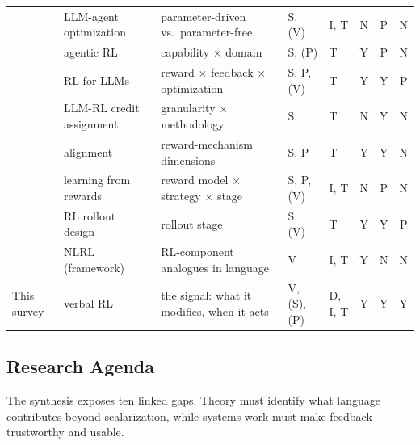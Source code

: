 \begin{table}[t]
\begin{tabular}{@{} p{} p{} p{} p{} p{} c c c @{}}
        \citet{du2025survey} & LLM-agent optimization & parameter-driven vs.\ parameter-free & S, (V) & I, T & N & P & N \\
        \citet{zhang2025landscape} & agentic RL & capability $\times$ domain & S, (P) & T & Y & P & N \\
        \citet{srivastava2025technical} & RL for LLMs & reward $\times$ feedback $\times$ optimization & S, P, (V) & T & Y & Y & P \\
        \citet{zhang2026reasoning} & LLM-RL credit assignment & granularity $\times$ methodology & S & T & N & Y & N \\
        \citet{ji2025survey} & alignment & reward-mechanism dimensions & S, P & T & Y & Y & N \\
        \citet{wu2025sailing} & learning from rewards & reward model $\times$ strategy $\times$ stage & S, P, (V) & I, T & N & P & N \\
        \citet{surana2026generate} & RL rollout design & rollout stage & S, (V) & T & Y & Y & P \\
        \citet{feng2024natural} & NLRL (framework) & RL-component analogues in language & V & I, T & Y & N & N \\
        \midrule
        This survey & verbal RL & the signal: what it modifies, when it acts & V, (S), (P) & D, I, T & Y & Y & Y \\
        \bottomrule
    \end{tabular}
\end{table}
\clearpage

\subsection{Research Agenda}
\label{subsec:agenda}

The synthesis exposes ten linked gaps. Theory must identify what language contributes beyond scalarization, while systems work must make feedback trustworthy and usable.

